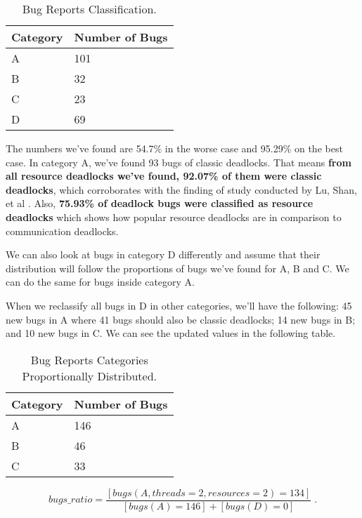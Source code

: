 \begin{table}
\begin{center}
\caption{Bug Reports Classification.}
\begin{tabular}{|l|l|}
\hline
Category & Number of Bugs \\
\hline
A & 101 \\   
B & 32 \\
C & 23 \\
D & 69 \\
\hline
\end{tabular}
\end{center}
\end{table}

The numbers we've found are 54.7\% in the worse case and 95.29\% on the best case. In category A, we've found 93 bugs of classic deadlocks. That means \textbf{from all resource deadlocks we've found, 92.07\% of them were classic deadlocks}, which corroborates with the finding of study conducted by Lu, Shan, et al \cite{lu}. Also, \textbf{75.93\% of deadlock bugs were classified as resource deadlocks} which shows how popular resource deadlocks are in comparison to communication deadlocks.

We can also look at bugs in category D differently and assume that their distribution will follow the proportions of bugs we've found for A, B and C. We can do the same for bugs inside category A.

When we reclassify all bugs in D in other categories, we'll have the following: 45 new bugs in A where 41 bugs should also be classic deadlocks; 14 new bugs in B; and 10 new bugs in C. We can see the updated values in the following table.

\begin{table}
\begin{center}
\caption{Bug Reports Categories Proportionally Distributed.}
\begin{tabular}{|l|l|}
\hline
Category & Number of Bugs \\
\hline
A & 146 \\   
B & 46 \\
C & 33 \\
\hline
\end{tabular}
\end{center}
\end{table}

\begin{equation}
bugs\_ratio = \frac{ [ bugs(A, threads=2, resources=2) = 134 ] }{ [bugs(A) = 146] + [bugs(D) = 0] } \; .
\end{equation}

